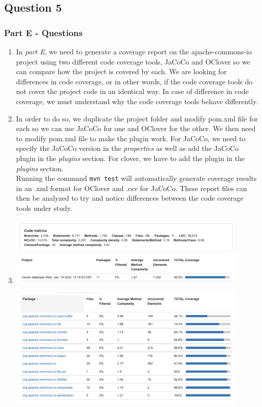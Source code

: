 \newpage
\subsection*{Question 5}

\subsubsection*{Part E - Questions}
\begin{enumerate}
    \item In \textit{part E}, we need to generate a coverage report on the apache-commons-io project using two different code coverage tools, JaCoCo and OClover so we can compare how the project is covered by each. We are looking for differences in code coverage, or in other words, if the code coverage tools do not cover the project code in an identical way. In case of difference in code coverage, we must understand why the code coverage tools behave differently. 
    \item  In order to do so, we duplicate the project folder and modify pom.xml file for each so we can use JaCoCo for one and OClover for the other. We then need to modify pom.xml file to make the plugin work. For JaCoCo, we need to specify the JaCoCo version in the \textit{properties} as well as add the JaCoCo plugin in the \textit{plugins} section. For clover, we have to add the plugin in the \textit{plugins} section. \\ Running the command \verb|mvn test| will automatically generate coverage results in an .xml format for OClover and .csv for JaCoCo. These report files can then be analyzed to try and notice differences between the code coverage tools under study. 
    \item 
    \begin{center}
        \includegraphics[width=0.9\textwidth]{img/clover1.png}
    \end{center}
    \begin{center}
        \includegraphics[width=0.9\textwidth]{img/clover2.png}

\end{center}
\end{enumerate}
